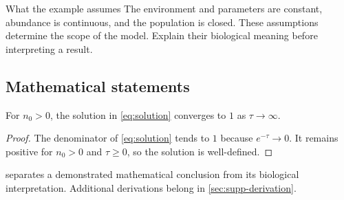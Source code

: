 \begin{ecobox}{What the example assumes}
The environment and parameters are constant, abundance is continuous, and the population is closed. These assumptions determine the scope of the model. Explain their biological meaning before interpreting a result.
\end{ecobox}

\subsection{Mathematical statements}
\begin{proposition}\label{prop:limit}
For $n_0>0$, the solution in \cref{eq:solution} converges to $1$ as $\tau\to\infty$.
\end{proposition}
\begin{proof}
The denominator of \cref{eq:solution} tends to $1$ because $e^{-\tau}\to0$. It remains positive for $n_0>0$ and $\tau\geq0$, so the solution is well-defined.
\end{proof}
 separates a demonstrated mathematical conclusion from its biological interpretation. Additional derivations belong in \cref{sec:supp-derivation}.

